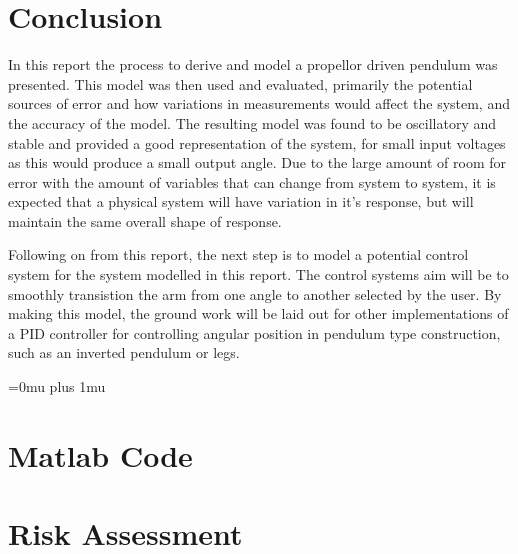 \documentclass[a4paper, 11pt, compsoc]{IEEEtran}
\begin{document}
    \section{Conclusion}\label{sec:conclusion}
        In this report the process to derive and model a propellor driven pendulum was presented. This model was then used and evaluated, primarily the potential sources of error and how variations in measurements would affect the system, and the accuracy of the model. The resulting model was found to be oscillatory and stable and provided a good representation of the system, for small input voltages as this would produce a small output angle. Due to the large amount of room for error with the amount of variables that can change from system to system, it is expected that a physical system will have variation in it's response, but will maintain the same overall shape of response.
        \par
        Following on from this report, the next step is to model a potential control system for the system modelled in this report. The control systems aim will be to smoothly transistion the arm from one angle to another selected by the user. By making this model, the ground work will be laid out for other implementations of a PID controller for controlling angular position in pendulum type construction, such as an inverted pendulum or legs.


    \Urlmuskip=0mu plus 1mu\relax
    
    

    \onecolumn
    \appendices
        \section{Matlab Code}
            
            
        \section{Risk Assessment}
\end{document}
